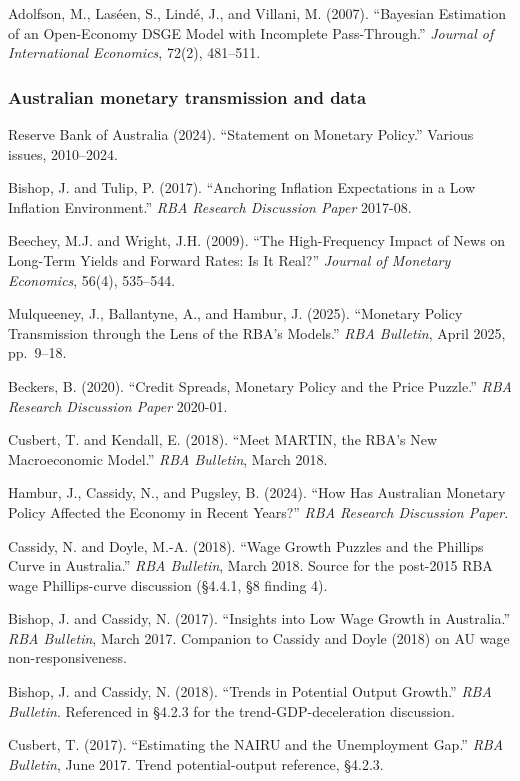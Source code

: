 \documentclass[
]{article}
\begin{document}
Adolfson, M., Laséen, S., Lindé, J., and Villani, M. (2007). ``Bayesian
Estimation of an Open-Economy DSGE Model with Incomplete Pass-Through.''
\emph{Journal of International Economics}, 72(2), 481--511.

\subsubsection{Australian monetary transmission and
data}\label{australian-monetary-transmission-and-data}

Reserve Bank of Australia (2024). ``Statement on Monetary Policy.''
Various issues, 2010--2024.

Bishop, J. and Tulip, P. (2017). ``Anchoring Inflation Expectations in a
Low Inflation Environment.'' \emph{RBA Research Discussion Paper}
2017-08.

Beechey, M.J. and Wright, J.H. (2009). ``The High-Frequency Impact of
News on Long-Term Yields and Forward Rates: Is It Real?'' \emph{Journal
of Monetary Economics}, 56(4), 535--544.

Mulqueeney, J., Ballantyne, A., and Hambur, J. (2025). ``Monetary Policy
Transmission through the Lens of the RBA's Models.'' \emph{RBA
Bulletin}, April 2025, pp.~9--18.

Beckers, B. (2020). ``Credit Spreads, Monetary Policy and the Price
Puzzle.'' \emph{RBA Research Discussion Paper} 2020-01.

Cusbert, T. and Kendall, E. (2018). ``Meet MARTIN, the RBA's New
Macroeconomic Model.'' \emph{RBA Bulletin}, March 2018.

Hambur, J., Cassidy, N., and Pugsley, B. (2024). ``How Has Australian
Monetary Policy Affected the Economy in Recent Years?'' \emph{RBA
Research Discussion Paper}.

Cassidy, N. and Doyle, M.-A. (2018). ``Wage Growth Puzzles and the
Phillips Curve in Australia.'' \emph{RBA Bulletin}, March 2018. Source
for the post-2015 RBA wage Phillips-curve discussion (§4.4.1, §8 finding
4).

Bishop, J. and Cassidy, N. (2017). ``Insights into Low Wage Growth in
Australia.'' \emph{RBA Bulletin}, March 2017. Companion to Cassidy and
Doyle (2018) on AU wage non-responsiveness.

Bishop, J. and Cassidy, N. (2018). ``Trends in Potential Output
Growth.'' \emph{RBA Bulletin}. Referenced in §4.2.3 for the
trend-GDP-deceleration discussion.

Cusbert, T. (2017). ``Estimating the NAIRU and the Unemployment Gap.''
\emph{RBA Bulletin}, June 2017. Trend potential-output reference,
§4.2.3.
\end{document}
